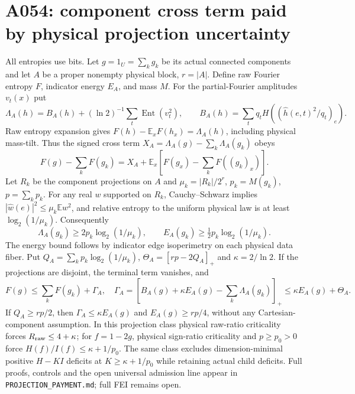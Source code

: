 \documentclass{article}
\begin{document}
\section*{A054: component cross term paid by physical projection uncertainty}
All entropies use bits. Let $g=1_U=\sum_k g_k$ be its actual connected
components and let $A$ be a proper nonempty physical block, $r=|A|$.
Define raw Fourier entropy $F$, indicator energy $E_A$, and mass $M$.
For the partial-Fourier amplitudes $v_t(x)$ put
\[
\Lambda_A(h)=B_A(h)+(\ln2)^{-1}\sum_t\operatorname{Ent}(v_t^2),\qquad
B_A(h)=\sum_t q_t H((\widehat h(e,t)^2/q_t)_e).
\]
Raw entropy expansion gives $F(h)-\mathbb E_xF(h_x)=\Lambda_A(h)$,
including physical mass-tilt. Thus the signed cross term
$X_A=\Lambda_A(g)-\sum_k\Lambda_A(g_k)$ obeys
\[
F(g)-\sum_kF(g_k)=X_A+\mathbb E_x\left[F(g_x)-\sum_kF((g_k)_x)\right].
\]
Let $R_k$ be the component projections on $A$ and
$\mu_k=|R_k|/2^r$, $p_k=M(g_k)$, $p=\sum_kp_k$.
For any real $w$ supported on $R_k$, Cauchy--Schwarz implies
$|\widehat w(e)|^2\le\mu_k\mathbb Ew^2$, and relative entropy to the
uniform physical law is at least $\log_2(1/\mu_k)$. Consequently
\[
\Lambda_A(g_k)\ge2p_k\log_2(1/\mu_k),\qquad
E_A(g_k)\ge\tfrac12p_k\log_2(1/\mu_k).
\]
The energy bound follows by indicator edge isoperimetry on each physical
data fiber. Put $Q_A=\sum_kp_k\log_2(1/\mu_k)$,
$\Theta_A=[rp-2Q_A]_+$ and $\kappa=2/\ln2$.
If the projections are disjoint, the terminal term vanishes, and
\[
F(g)\le\sum_kF(g_k)+\Gamma_A,
\quad\Gamma_A=[B_A(g)+\kappa E_A(g)-\sum_k\Lambda_A(g_k)]_+
\le\kappa E_A(g)+\Theta_A.
\]
If $Q_A\ge rp/2$, then $\Gamma_A\le\kappa E_A(g)$ and
$E_A(g)\ge rp/4$, without any Cartesian-component assumption.
In this projection class physical raw-ratio criticality forces
$R_{\rm raw}\le4+\kappa$; for $f=1-2g$, physical sign-ratio criticality
and $p\ge p_0>0$ force $H(f)/I(f)\le\kappa+1/p_0$.
The same class excludes dimension-minimal positive $H-KI$ deficits
at $K\ge\kappa+1/p_0$ while retaining actual child deficits.
Full proofs, controls and the open universal admission line appear in
\texttt{PROJECTION\_PAYMENT.md}; full FEI remains open.
\end{document}
